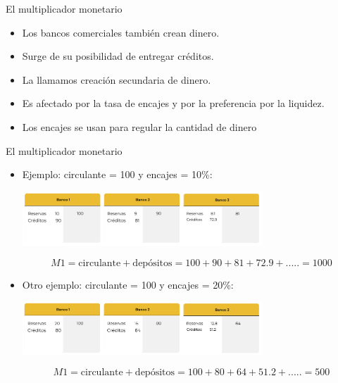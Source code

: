 \documentclass{beamer}
\begin{document}
\begin{frame}{El multiplicador monetario}
    \begin{itemize}
        \item Los bancos comerciales también crean dinero.
        \item Surge de su posibilidad de entregar créditos.
        \item La llamamos creación secundaria de dinero.
        \item Es afectado por la tasa de encajes y por la preferencia por la liquidez.
        \item Los encajes se usan para regular la cantidad de dinero
    \end{itemize}
\end{frame}

\begin{frame}{El multiplicador monetario}
    \begin{itemize}
        \item Ejemplo:  circulante = 100  y  encajes = 10\%:

        \begin{center}
            \includegraphics[width=9cm]{../Figures/C37.15.png}
    
            \[M1 = \text{circulante} + \text{depósitos} = 100 + 90 + 81 + 72.9 + ..... = 1000 \]
        \end{center}
        \item Otro ejemplo:  circulante = 100  y  encajes = 20\%:
            
        \begin{center}
            \includegraphics[width=9cm]{../Figures/C37.16.png}
    
            \[M1 = \text{circulante} + \text{depósitos} = 100 + 80 + 64 + 51.2 + ..... = 500 \]
        \end{center}
    \end{itemize}
\end{frame}
\end{document}
